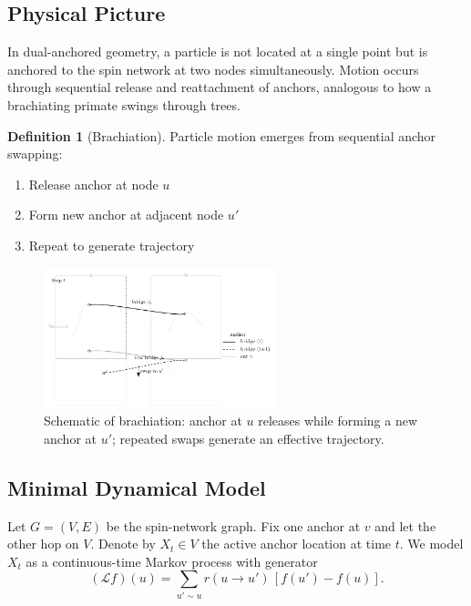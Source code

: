 \documentclass[11pt]{article}
\theoremstyle{plain}
\theoremstyle{definition}
\newtheorem{definition}[theorem]{Definition}
\begin{document}
\subsection{Physical Picture}

In dual-anchored geometry, a particle is not located at a single point but is anchored to the spin network at two nodes simultaneously. Motion occurs through sequential release and reattachment of anchors, analogous to how a brachiating primate swings through trees.

\begin{definition}[Brachiation]
  Particle motion emerges from sequential anchor swapping:
  \begin{enumerate}
    \item Release anchor at node $u$
    \item Form new anchor at adjacent node $u'$
    \item Repeat to generate trajectory
  \end{enumerate}
\end{definition}

\begin{figure}[h]
  \centering
  \includegraphics[width=0.6\textwidth]{fig_brachiation_schematic.pdf}
  \caption{Schematic of brachiation: anchor at $u$ releases while forming a new anchor at $u'$; repeated swaps generate an effective trajectory.}
  \label{fig:brachiation}
\end{figure}

\subsection{Minimal Dynamical Model}
\label{subsec:brachiation-dynamics}

Let $G=(V,E)$ be the spin-network graph. Fix one anchor at $v$ and let the other hop on $V$. Denote by $X_t\in V$ the active anchor location at time $t$. We model $X_t$ as a continuous-time Markov process with generator
\[
  (\mathcal{L}f)(u) = \sum_{u'\sim u} r(u\to u')\,[f(u')-f(u)].
\]
\end{document}

